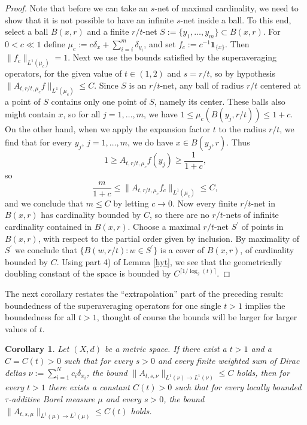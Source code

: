 \documentclass[12pt]{amsart}
\newtheorem{corollary}[theorem]{Corollary}
\theoremstyle{definition}
\theoremstyle{parrafo}
\begin{document}
\begin{proof}
 Note that before we can take an $s$-net of maximal cardinality, we need to show that it is not possible to have an infinite $s$-net inside a ball.  To this end, select a ball $B(x,r)$ and a finite $r/t$-net $S := \{y_1,\dots,  y_m\} \subset  B(x,r)$.  For $0 < c \ll 1$ define 
$\mu_c :=  c  \delta_x + \sum_{i = i}^m \delta_{y_i}$, and set $f_c := c^{-1} \mathbf{1}_{\{x\}}$.  Then $\|f_c\|_{L^1(\mu_c)} = 1$. Next we use the bounds satisfied by the superaveraging operators,  for the given value of $t \in (1,2) $ and $s = r/t$, so by hypothesis  $\|A_{t, r/t, \mu_c}  f\|_{L^1(\mu_c)} \le C.$ Since $S$ is an $r/t$-net, any  ball of radius $r/t$ centered at a point of $S$ contains only one point of $S$, namely its center. These balls also might contain $x$, so for all $j = 1, \dots , m$, we have 
$1 \le \mu_c (B(y_j, r/t)) \le 1 + c$. On the other hand, when we apply the expansion factor $t$ to the radius $r/t$, we find that for every $y_j$, $j = 1, \dots , m$, we do have $x \in B(y_j, r)$. Thus
 	$$
 	1
 	\ge A_{t, r/t, \mu_c}  f (y_j)  \ge 
 	\frac{1}{ 1 + c},
 	$$
	so
	$$
	\frac{m}{ 1 + c} 
	\le
	\|A_{t, r/t, \mu_c} f_c\|_{L^1(\mu_c)}
	\le C,		
	$$
 	and we conclude that $m\le C$ by letting $c \to 0$. Now every finite $r/t$-net in $B(x,r)$ has cardinality bounded by $C$, so there are no  $r/t$-nets of infinite cardinality contained in $B(x,r)$. Choose a maximal $r/t$-net $S^\prime$
of points in $B(x,r)$, with respect to the partial order given by inclusion. By maximality of $S^\prime$ we conclude that 
$\{B(w, r/t) : w\in S^\prime\}$ is a cover of $B(x,r)$, of cardinality bounded by $C$. Using part 4) of Lemma \ref{hyt},
we see that the geometrically  doubling constant of the space is bounded by $C^{\lceil 1/\log_2(t)\rceil}$.
 \end{proof}  
  
  The next corollary restates the ``extrapolation'' part of the preceding result:  boundedness of the superaveraging operators for one single $t > 1$ implies the boundedness for all $t >1$, thought 
of course the bounds will be larger for larger values of $t$.
  	
	\begin{corollary}  \label{extrapolation} Let $(X, d)$ be a  
		metric  space. If there exist a  $t > 1$ and a $C = C(t) > 0$ such that for every $s > 0$ and every finite  weighted sum of Dirac deltas $\nu := \sum_{i = 1}^N c_i \delta_{x_i}$, the bound
		$\|A_{t, s, \nu} \|_{L^1(\nu)\to L^1(\nu)} \le C$ holds, then for	every $t > 1$ there exists a constant $C(t) > 0$ such that for every locally bounded $\tau$-additive Borel measure $\mu$ and every $s > 0$, the bound
		$\|A_{t, s, \mu} \|_{L^1(\mu)\to L^1(\mu)} \le C(t)$ holds.	
		\end{corollary} 	
\end{document}
